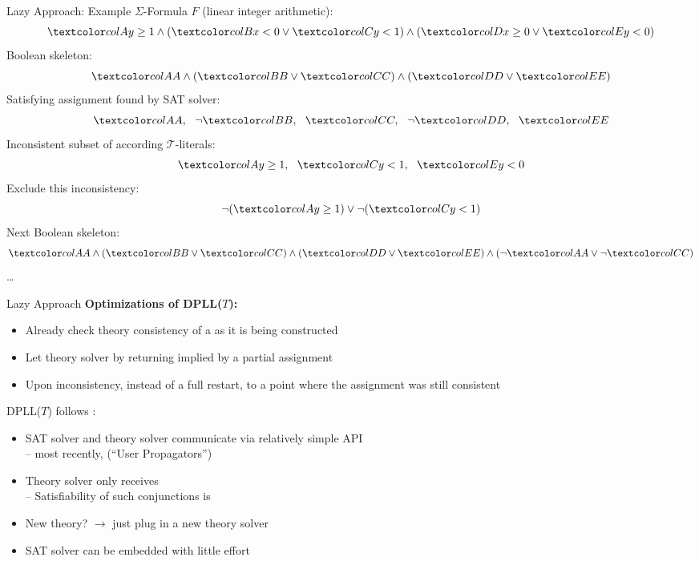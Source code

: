 \documentclass[t,english]{sdqbeamer}
\begin{document}
\begin{frame}{Lazy Approach: Example}
	$\Sigma$-Formula $F$ (linear integer arithmetic):\\[-4mm]
	\[ \propA{y \geq 1} \wedge (\propB{x < 0} \vee \propC{y < 1}) \wedge (\propD{x \geq 0} \vee \propE{y < 0}) \]
	\pause
	Boolean skeleton:\\[-4mm]
	\[ \propA{A} \wedge (\propB{B} \vee \propC{C}) \wedge (\propD{D} \vee \propE{E}) \]	
	\pause
	Satisfying assignment found by SAT solver:\\[-4mm]
	\[ \propA{A},\ \ \neg\propB{B},\ \ \propC{C},\ \ \neg\propD{D},\ \ \propE{E} \]
	\pause
	Inconsistent subset of according $\mathcal{T}$-literals:\\[-4mm]
	\[ \propA{y \geq 1},\ \ \propC{y < 1},\ \ \propE{y < 0} \]
	\pause
	Exclude this inconsistency:\\[-4mm]
	\[ \neg(\propA{y \geq 1}) \vee \neg(\propC{y < 1}) \]
	\pause
	Next Boolean skeleton:\\[-4mm]
	\[ \propA{A} \wedge (\propB{B} \vee \propC{C}) \wedge (\propD{D} \vee \propE{E}) \wedge (\neg\propA{A} \vee \neg\propC{C}) \]	
	\ldots
\end{frame}

\begin{frame}{Lazy Approach}
	\textbf{Optimizations of DPLL($T$):}
	\begin{itemize}
		\item Already check theory consistency of a  as it is being constructed
		\item Let theory solver  by returning  implied by a partial assignment
		\item Upon inconsistency, instead of a full restart,  to a point where the assignment was still consistent
	\end{itemize}
	
	\vspace*{3mm}
	\pause
	DPLL($T$) follows :
	\begin{itemize}
		\item SAT solver and theory solver communicate via relatively simple API\\
		-- most recently,  (``User Propagators'')~\cite{fazekas2023ipasir}
		\item Theory solver only receives \\
		-- Satisfiability of such conjunctions is 
		\item New theory? $\rightarrow$ just plug in a new theory solver
		\item SAT solver can be embedded with little effort
	\end{itemize}
\end{frame}
\end{document}
